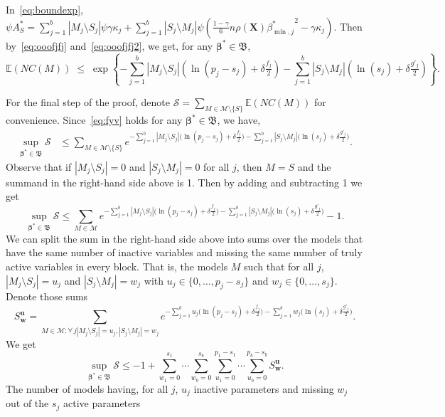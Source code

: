 \documentclass[
  12pt]{article}
\newcommand{\E}{\mathbb{E}}
\newcommand{\M}{\mathcal{M}}
\newcommand{\bu}{\mathbf{u}}
\newcommand{\bw}{\mathbf{w}}
\newcommand{\bbeta}{\boldsymbol{\beta}}
\newcommand{\bX}{\mathbf{X}}
\newcommand{\bB}{\mathfrak{B}}
\begin{document}
In~\eqref{eq:boundexp}, $\psi A^*_S=\sum_{j=1}^b|M_j \setminus S_j|\psi\gamma\kappa_j + \sum_{j=1}^b |S_j\setminus M_j |\psi\left(\tfrac{1-\gamma}{6} n \rho(\bX) {\beta^*_{\min,j}}^{2} - \gamma\kappa_j\right)$. Then by~\eqref{eq:ooofjfj} and~\eqref{eq:ooofjfj2}, we get, for any $\bbeta^*\in \bB$,
\begin{equation}\label{eq:fyv}
\E(NC(M))\;\leq\;\exp\left\{- \sum_{j=1}^b |M_j\setminus S_j|(\ln(p_j-s_j)+\delta \tfrac{f_j}{2})-\sum_{j=1}^b |S_j\setminus M_j|(\ln(s_j)+\delta \tfrac{g'_j}{2})\right\}.    
\end{equation}

For the final step of the proof, denote $\mathcal{S}= \sum_{M \in \M\setminus \{S\}} \E\left(NC(M)\right)$ for convenience. Since~\eqref{eq:fyv} holds for any $\bbeta^*\in \bB$, we have,
\begin{align*}
   \sup_{\bbeta^*\in \bB} \mathcal{S} &\leq \sum_{M \in \M\setminus \{S\}}e^{- \sum_{j=1}^b |M_j\setminus S_j|\big(\ln(p_j-s_j)+\delta \tfrac{f_j}{2}\big)-\sum_{j=1}^b |S_j\setminus M_j|\big(\ln(s_j)+\delta \tfrac{g'_j}{2}\big)}.
\end{align*}
Observe that if $|M_j\setminus S_j|=0$ and $|S_j\setminus M_j|=0$ for all $j$, then $M=S$ and the summand in the right-hand side above is 1. Then by adding and subtracting 1 we get
$$\sup_{\bbeta^*\in \bB} \mathcal{S} \leq \sum_{M \in \M}e^{- \sum_{j=1}^b |M_j\setminus S_j|\big(\ln(p_j-s_j)+\delta \tfrac{f_j}{2}\big)-\sum_{j=1}^b |S_j\setminus M_j|\big(\ln(s_j)+\delta \tfrac{g'_j}{2}\big)}-1.$$
We can split the sum in the right-hand side above into sums over the models that have the same number of inactive variables and missing the same number of truly active variables in every block. That is, the models $M$ such that for all $j$, $|M_j\setminus S_j|=u_j$ and $|S_j\setminus M_j|=w_j$ with $u_j \in \{0,\ldots,p_j-s_j\}$ and $w_j \in \{0,\ldots,s_j\}$. Denote those sums
$$S^{\bu}_{\bw}=\sum_{M \in \M:\forall \,j |M_j\setminus S_j|=u_j, |S_j\setminus M_j|=w_j } e^{- \sum_{j=1}^b u_j\big(\ln(p_j-s_j)+\delta \tfrac{f_j}{2}\big)-\sum_{j=1}^b w_j\big(\ln(s_j)+\delta \tfrac{g'_j}{2}\big)}.$$
We get
\begin{equation}\label{eq:uygfew}
    \sup_{\bbeta^*\in \bB} \mathcal{S} \leq -1+\sum_{w_1=0}^{s_1}\cdots\sum_{w_b=0}^{s_b}\sum_{u_1=0}^{p_1-s_1}\cdots\sum_{u_b=0}^{p_b-s_b}S^{\bu}_{\bw}.
\end{equation}
The number of models having, for all $j$, $u_j$ inactive parameters and missing $w_j$ out of the $s_j$ active parameters %
\end{document}
